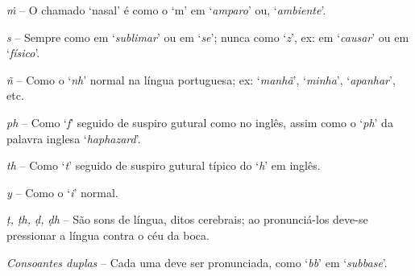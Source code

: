 \emph{ṁ} -- O chamado ‘nasal’ é como o ‘m’ em ‘\emph{amparo}’ ou, ‘\emph{ambiente}’.

\emph{s} -- Sempre como em ‘\emph{sublimar}’ ou em ‘\emph{se}’; nunca como ‘\emph{z}’, ex: em ‘\emph{causar}’ ou em ‘\emph{físico}’.

\emph{ñ} -- Como o ‘\emph{nh}’ normal na língua portuguesa; ex: ‘\emph{manhã}’, ‘\emph{minha}’, ‘\emph{apanhar}’, etc.

\emph{ph} -- Como ‘\emph{f}’ seguido de suspiro gutural como no inglês, assim como o ‘\emph{ph}’ da palavra inglesa ‘\emph{haphazard}’.

\emph{th} -- Como ‘\emph{t}’ seguido de suspiro gutural típico do ‘\emph{h}’ em inglês.

\emph{y} -- Como o ‘\emph{i}’ normal.

\emph{ṭ, ṭh, ḍ, ḍh} -- São sons de língua, ditos cerebrais; ao pronunciá-los deve-se pressionar a língua contra o céu da boca.

\emph{Consoantes duplas} -- Cada uma deve ser pronunciada, como ‘\emph{bb}’ em ‘\emph{subbase}’.
